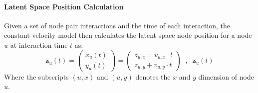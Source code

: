 \paragraph{Latent Space Position Calculation}
Given a set of node pair interactions and the time of each interaction, the constant velocity model then calculates the latent space node position for a node $u$ at interaction time $t$ as:
\begin{equation}
    \textbf{z}_{u}(t) = 
    \begin{pmatrix}
        x_{u}(t) \\
        y_{u}(t)
    \end{pmatrix}
    =
    \begin{pmatrix}
        z_{u,x}+v_{u,x} \cdot t \\
        z_{u,y}+v_{u,y} \cdot t
    \end{pmatrix}
    \;\; , \;\; \textbf{z}_{u}(t)
    \label{eq:Method:ConstantVelocity:latent_pos}
\end{equation}
Where the subscripts $(u,x)$ and $(u,y)$ denotes the $x$ and $y$ dimension of node $u$.

